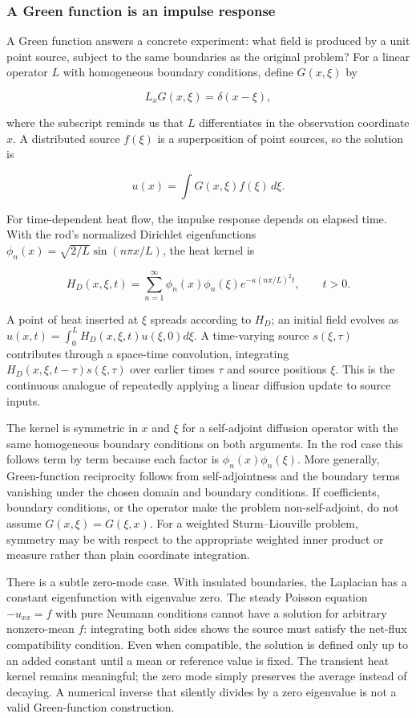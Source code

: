 \subsubsection{A Green function is an impulse response}\label{02-foundations-ii-ch025-a-green-function-is-an-impulse-response}

A Green function answers a concrete experiment: what field is produced by a unit point source, subject to the same boundaries as the original problem? For a linear operator \(L\) with homogeneous boundary conditions, define \(G(x,\xi)\) by

\[
L_xG(x,\xi)=\delta(x-\xi),
\]

where the subscript reminds us that \(L\) differentiates in the observation coordinate \(x\). A distributed source \(f(\xi)\) is a superposition of point sources, so the solution is

\[
u(x)=\int G(x,\xi)f(\xi)\,d\xi.
\]

For time-dependent heat flow, the impulse response depends on elapsed time. With the rod's normalized Dirichlet eigenfunctions \(\phi_n(x)=\sqrt{2/L}\sin(n\pi x/L)\), the heat kernel is

\[
H_D(x,\xi,t)=\sum_{n=1}^{\infty}\phi_n(x)\phi_n(\xi)e^{-\kappa(n\pi/L)^2t},\qquad t>0.
\]

A point of heat inserted at \(\xi\) spreads according to \(H_D\); an initial field evolves as \(u(x,t)=\int_0^LH_D(x,\xi,t)u(\xi,0)d\xi\). A time-varying source \(s(\xi,\tau)\) contributes through a space-time convolution, integrating \(H_D(x,\xi,t-\tau)s(\xi,\tau)\) over earlier times \(\tau\) and source positions \(\xi\). This is the continuous analogue of repeatedly applying a linear diffusion update to source inputs.

The kernel is symmetric in \(x\) and \(\xi\) for a self-adjoint diffusion operator with the same homogeneous boundary conditions on both arguments. In the rod case this follows term by term because each factor is \(\phi_n(x)\phi_n(\xi)\). More generally, Green-function reciprocity follows from self-adjointness and the boundary terms vanishing under the chosen domain and boundary conditions. If coefficients, boundary conditions, or the operator make the problem non-self-adjoint, do not assume \(G(x,\xi)=G(\xi,x)\). For a weighted Sturm--Liouville problem, symmetry may be with respect to the appropriate weighted inner product or measure rather than plain coordinate integration.

There is a subtle zero-mode case. With insulated boundaries, the Laplacian has a constant eigenfunction with eigenvalue zero. The steady Poisson equation \(-u_{xx}=f\) with pure Neumann conditions cannot have a solution for arbitrary nonzero-mean \(f\): integrating both sides shows the source must satisfy the net-flux compatibility condition. Even when compatible, the solution is defined only up to an added constant until a mean or reference value is fixed. The transient heat kernel remains meaningful; the zero mode simply preserves the average instead of decaying. A numerical inverse that silently divides by a zero eigenvalue is not a valid Green-function construction.

